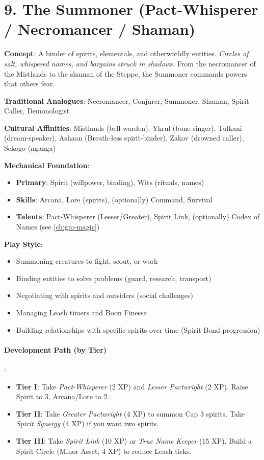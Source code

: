 \section{9. The Summoner (Pact-Whisperer / Necromancer / Shaman)}
\label{sec:concept-summoner}

\textbf{Concept}: A binder of spirits, elementals, and otherworldly entities. \emph{Circles of salt, whispered names, and bargains struck in shadows.} From the necromancer of the Mistlands to the shaman of the Steppe, the Summoner commands powers that others fear.

\textbf{Traditional Analogues}: Necromancer, Conjurer, Summoner, Shaman, Spirit Caller, Demonologist

\textbf{Cultural Affinities}: Mistlands (bell-warden), Ykrul (bone-singer), Tulkani (dream-speaker), Ashaan (Breath-less spirit-binder), Zakov (drowned caller), Sekogo (nganga)

\textbf{Mechanical Foundation}:
\begin{itemize}
\item \textbf{Primary}: Spirit (willpower, binding), Wits (rituals, names)
\item \textbf{Skills}: Arcana, Lore (spirits), (optionally) Command, Survival
\item \textbf{Talents}: Pact-Whisperer (Lesser/Greater), Spirit Link, (optionally) Codex of Names (see \ref{ch:gm-magic})
\end{itemize}

\textbf{Play Style}:
\begin{itemize}
\item Summoning creatures to fight, scout, or work
\item Binding entities to solve problems (guard, research, transport)
\item Negotiating with spirits and outsiders (social challenges)
\item Managing Leash timers and Boon Finesse
\item Building relationships with specific spirits over time (Spirit Bond progression)
\end{itemize}

\paragraph{Development Path (by Tier)}:
\begin{itemize}
\item \textbf{Tier I}: Take \emph{Pact-Whisperer} (2 XP) and \emph{Lesser Pactwright} (2 XP). Raise Spirit to 3, Arcana/Lore to 2.
\item \textbf{Tier II}: Take \emph{Greater Pactwright} (4 XP) to summon Cap 3 spirits. Take \emph{Spirit Synergy} (4 XP) if you want two spirits.
\item \textbf{Tier III}: Take \emph{Spirit Link} (10 XP) or \emph{True Name Keeper} (15 XP). Build a Spirit Circle (Minor Asset, 4 XP) to reduce Leash ticks.
\end{itemize}

